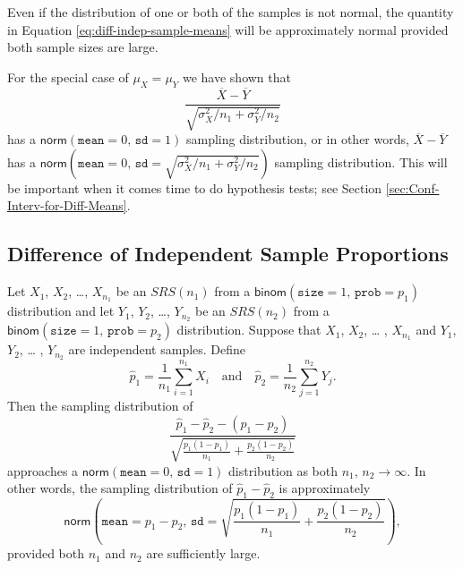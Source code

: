 \documentclass[captions=tableheading]{scrbook}
\begin{document}
\begin{rem}
Even if the distribution of one or both of the samples is not normal, the quantity in Equation \ref{eq:diff-indep-sample-means} will be approximately normal provided both sample sizes are large.
\end{rem}

\begin{rem}
For the special case of \(\mu_{X}=\mu_{Y}\) we have shown that 
\begin{equation} \frac{\overline{X}-\overline{Y}}{\sqrt{\sigma_{X}^{2}/n_{1}+\sigma_{Y}^{2}/n_{2}}}
\end{equation}
has a \(\mathsf{norm}(\mathtt{mean}=0,\,\mathtt{sd}=1)\) sampling distribution, or in other words, \(\overline{X}-\overline{Y}\) has a \(\mathsf{norm}(\mathtt{mean}=0,\,\mathtt{sd}=\sqrt{\sigma_{X}^{2}/n_{1}+\sigma_{Y}^{2}/n_{2}})\) sampling distribution. This will be important when it comes time to do hypothesis tests; see Section \ref{sec:Conf-Interv-for-Diff-Means}.
\end{rem}
\subsection{Difference of Independent Sample Proportions}
\label{sec-8-4-2}


\begin{prop}
Let \(X_{1}\), \(X_{2}\), \ldots{}, \(X_{n_{1}}\) be an \(SRS(n_{1})\) from a \(\mathsf{binom}(\mathtt{size}=1,\,\mathtt{prob}=p_{1})\) distribution and let \(Y_{1}\), \(Y_{2}\), \ldots{}, \(Y_{n_{2}}\) be an \(SRS(n_{2})\) from a \(\mathsf{binom}(\mathtt{size}=1,\,\mathtt{prob}=p_{2})\) distribution. Suppose that \(X_{1}\), \(X_{2}\), \ldots{} , \(X_{n_{1}}\) and \(Y_{1}\), \(Y_{2}\), \ldots{} , \(Y_{n_{2}}\) are independent samples. Define 
\begin{equation}
\hat{p}_{1}=\frac{1}{n_{1}}\sum_{i=1}^{n_{1}}X_{i}\quad\mbox{and}\quad\hat{p}_{2}=\frac{1}{n_{2}}\sum_{j=1}^{n_{2}}Y_{j}.
\end{equation}
Then the sampling distribution of
\begin{equation}
\frac{\hat{p}_{1}-\hat{p}_{2}-(p_{1}-p_{2})}{\sqrt{\frac{p_{1}(1-p_{1})}{n_{1}}+\frac{p_{2}(1-p_{2})}{n_{2}}}}
\end{equation}
approaches a \(\mathsf{norm}(\mathtt{mean}=0,\,\mathtt{sd}=1)\) distribution as both \(n_{1},\, n_{2}\to\infty\). In other words, the sampling distribution of \(\hat{p}_{1}-\hat{p}_{2}\) is approximately
\begin{equation}
\mathsf{norm}\left(\mathtt{mean}=p_{1}-p_{2},\,\mathtt{sd}=\sqrt{\frac{p_{1}(1-p_{1})}{n_{1}}+\frac{p_{2}(1-p_{2})}{n_{2}}}\right),
\end{equation}
provided both \(n_{1}\) and \(n_{2}\) are sufficiently large.
\end{prop}
\end{document}
